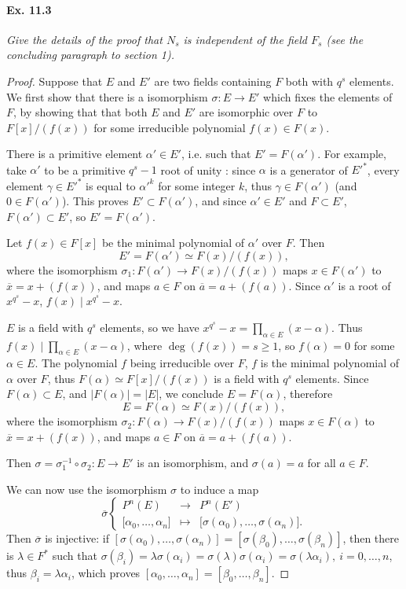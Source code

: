 \documentclass[11pt,a4paper]{article}
\begin{document}
\paragraph{Ex. 11.3}{\it Give the details of the proof that $N_s$ is independent of the field $F_s$ (see the concluding paragraph to section 1).
}
\begin{proof}
Suppose that $E$ and $E'$ are two fields containing $F$ both with $q^s$ elements. We first show that there is a isomorphism $\sigma : E \to E'$ which fixes the elements of $F$, by showing that that both $E$ and $E'$ are isomorphic over $F$ to $F[x]/(f(x))$ for some irreducible polynomial $f(x) \in F(x)$.

There is a primitive element $\alpha' \in E'$, i.e. such that $E' = F(\alpha')$. For example, take $\alpha'$ to be a primitive $q^s - 1$ root of unity : since $\alpha$ is a generator of $E'^*$, every element $\gamma \in E'^*$ is equal to $\alpha'^k$ for some integer $k$, thus $\gamma \in F(\alpha')$ (and $0 \in F(\alpha')$). This proves $E' \subset F(\alpha')$, and since $\alpha' \in E'$ and $F \subset E'$, $F(\alpha') \subset E'$, so $E' = F(\alpha')$.

Let $f(x) \in F[x]$ be the minimal polynomial of $\alpha'$ over $F$. Then
$$E' = F(\alpha') \simeq F(x)/(f(x)),$$
where the isomorphism $\sigma_1 : F(\alpha') \to F(x)/(f(x))$ maps $x \in F(\alpha')$ to $\overline{x} = x + (f(x))$, and maps $a \in F$ on $\overline{a} = a + (f(a))$.
Since $\alpha'$ is a root of $x^{q^s} -x$, $f(x) \mid x^{q^s} - x$. 

 $E$ is a field with $q^s$ elements, so we have $x^{q^s} - x = \prod_{\alpha \in E} (x-\alpha)$. Thus $f(x) \mid \prod_{\alpha \in E} (x-\alpha)$, where $\deg(f(x)) = s \geq 1$, so $f(\alpha) = 0$ for some $\alpha \in E$. The polynomial $f$ being irreducible over $F$, $f$ is the minimal polynomial of $\alpha$ over $F$, thus $F(\alpha) \simeq F[x]/(f(x))$ is a field with $q^s$ elements. 
 Since $F(\alpha) \subset E$, and $|F(\alpha)| = |E|$, we conclude $E = F(\alpha)$, therefore
$$E = F(\alpha) \simeq F(x)/(f(x)),$$
where the isomorphism $\sigma_2 : F(\alpha) \to F(x)/(f(x))$ maps $x \in F(\alpha)$ to $\overline{x} = x + (f(x))$, and maps $a \in F$ on $\overline{a} = a + (f(a))$.

Then  $\sigma = \sigma_1^{-1} \circ \sigma_2 : E \to E'$ is an isomorphism, and $\sigma(a) = a$ for all $a \in F$.
 
 \bigskip
 
 We can now use the isomorphism $\sigma$ to induce a map 
 $$\overline{\sigma}
 \left\{
 \begin{array}{ccl}
 P^n(E)& \to &P^n(E')\\
 {[}\alpha_0,\ldots,\alpha_n{]} &\mapsto & {[}\sigma(\alpha_0),\ldots,\sigma(\alpha_n){]}.
 \end{array}
 \right.
 $$
 Then $\overline{\sigma}$ is injective: if $[\sigma(\alpha_0),\ldots,\sigma(\alpha_n)] = [\sigma(\beta_0),\ldots,\sigma(\beta_n)]$, then there is $\lambda \in F^*$ such that $\sigma(\beta_i) = \lambda \sigma(\alpha_i) = \sigma(\lambda)\sigma(\alpha_i) = \sigma(\lambda \alpha_i),\ i = 0,\ldots,n$, thus $\beta_i = \lambda \alpha_i$, which proves $[\alpha_0,\ldots,\alpha_n] = [\beta_0,\ldots,\beta_n]$.
 

\end{proof}
\end{document}
